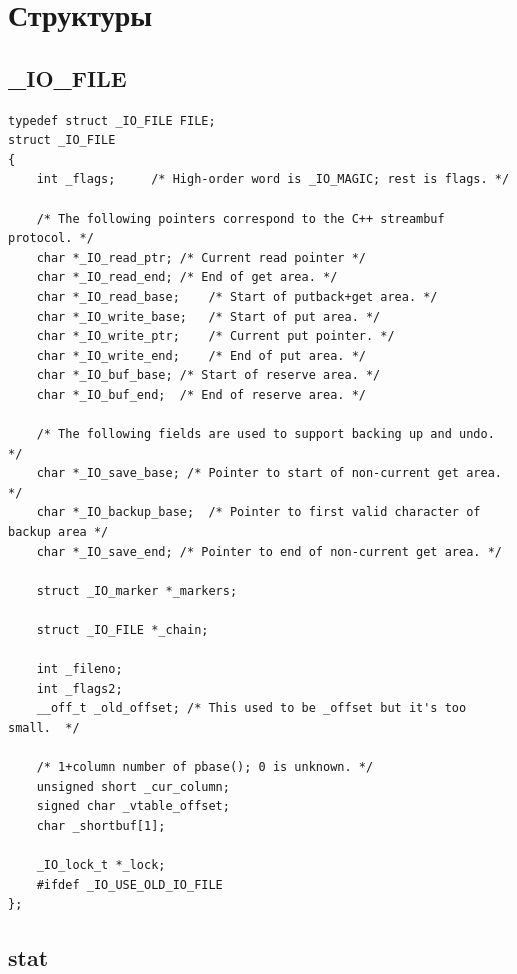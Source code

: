 \chapter{Структуры}

\section{\_IO\_FILE}

\begin{lstlisting}
typedef struct _IO_FILE FILE;
struct _IO_FILE
{
	int _flags;		/* High-order word is _IO_MAGIC; rest is flags. */
	
	/* The following pointers correspond to the C++ streambuf protocol. */
	char *_IO_read_ptr;	/* Current read pointer */
	char *_IO_read_end;	/* End of get area. */
	char *_IO_read_base;	/* Start of putback+get area. */
	char *_IO_write_base;	/* Start of put area. */
	char *_IO_write_ptr;	/* Current put pointer. */
	char *_IO_write_end;	/* End of put area. */
	char *_IO_buf_base;	/* Start of reserve area. */
	char *_IO_buf_end;	/* End of reserve area. */
	
	/* The following fields are used to support backing up and undo. */
	char *_IO_save_base; /* Pointer to start of non-current get area. */
	char *_IO_backup_base;  /* Pointer to first valid character of backup area */
	char *_IO_save_end; /* Pointer to end of non-current get area. */
	
	struct _IO_marker *_markers;
	
	struct _IO_FILE *_chain;
	
	int _fileno;
	int _flags2;
	__off_t _old_offset; /* This used to be _offset but it's too small.  */
	
	/* 1+column number of pbase(); 0 is unknown. */
	unsigned short _cur_column;
	signed char _vtable_offset;
	char _shortbuf[1];
	
	_IO_lock_t *_lock;
	#ifdef _IO_USE_OLD_IO_FILE
};
\end{lstlisting}

\section{stat}

